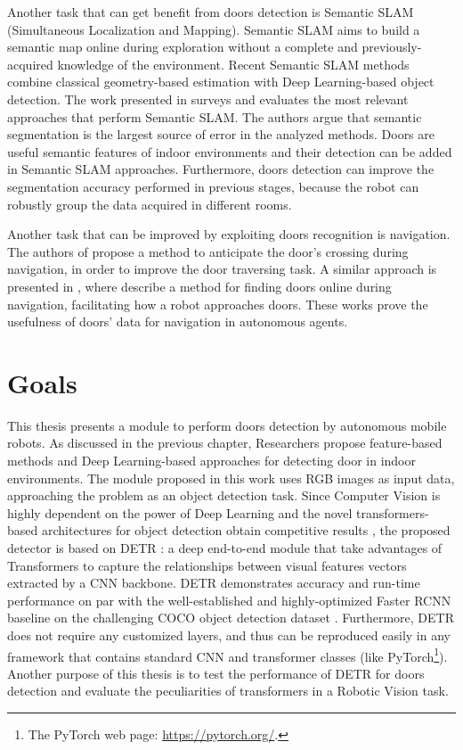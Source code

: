 Another task that can get benefit from doors detection is Semantic SLAM (Simultaneous Localization and Mapping). Semantic SLAM aims to build a semantic map online during exploration without a complete and previously-acquired knowledge of the environment. Recent Semantic SLAM methods combine classical geometry-based estimation with Deep Learning-based object detection. The work presented in \cite{semanticslamsurvey} surveys and evaluates the most relevant approaches that perform Semantic SLAM. The authors argue that semantic segmentation is the largest source of error in the analyzed methods. Doors are useful semantic features of indoor environments and their detection can be added in Semantic SLAM approaches. Furthermore, doors detection can improve the segmentation accuracy performed in previous stages, because the robot can robustly group the data acquired in different rooms. 

Another task that can be improved by exploiting doors recognition is navigation. The authors of \cite{sonarandivisualdoordetection} propose a method to anticipate the door's crossing during navigation, in order to improve the door traversing task. A similar approach is presented in \cite{doorsandnavigation}, where \citeauthor{doorsandnavigation} describe a method for finding doors online during navigation, facilitating how a robot approaches doors. These works prove the usefulness of doors' data for navigation in autonomous agents.

\section{Goals}
\label{sec:goals}
This thesis presents a module to perform doors detection by autonomous mobile robots. As discussed in the previous chapter, Researchers propose feature-based methods \cite{sonarandivisualdoordetection, humanoid, edgeandcornerdoorsdetector} and Deep Learning-based approaches \cite{detectdoorsfeature, doorsandnavigation, doorcabinet} for detecting door in indoor environments.  The module proposed in this work uses RGB images as input data, approaching the problem as an object detection task. Since Computer Vision is highly dependent on the power of Deep Learning \cite{deeplearningoverview} and the novel transformers-based architectures for object detection obtain competitive results \cite{surveytransformer}, the proposed detector is based on DETR \cite{detr}: a deep end-to-end module that take advantages of Transformers to capture the relationships between visual features vectors extracted by a CNN backbone. DETR demonstrates accuracy and run-time performance on par with the well-established and highly-optimized Faster RCNN \cite{fasterrcnn} baseline on the challenging COCO object detection dataset \cite{coco}. Furthermore, DETR does not require any customized layers, and thus can be reproduced easily in any framework that contains standard CNN and transformer classes (like PyTorch\footnote{The PyTorch web page: \url{https://pytorch.org/}.}). Another purpose of this thesis is to test the performance of DETR for doors detection and evaluate the peculiarities of transformers in a Robotic Vision task.

